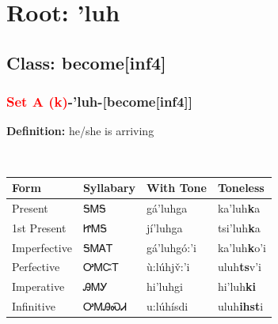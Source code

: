\needspace{4in}
\section*{Root: 'luh}
\nopagebreak
{}
\needspace{3in}
\subsection*{Class: become[inf4]}
\nopagebreak
\needspace{2in}
\subsubsection*{\textcolor{Red}{Set A (k)}{-}\textbf{'luh}{-}[become[inf4]]}
\nopagebreak
\textbf{Definition: } he/she is arriving
\\[0.5em]
\begin{tabularx}{\textwidth}{l X X X}%
\toprule%
\textbf{Form}&\textbf{Syllabary}&\textbf{With Tone}&\textbf{Toneless}\\%
\midrule%
Present&ᎦᎷᎦ&gá’luhga&ka'luh\textbf{k}a\\%
1st Present&ᏥᎷᎦ&jí’luhga&tsi'luh\textbf{k}a\\%
Imperfective&ᎦᎷᎪᎢ&gá’luhgó:’i&ka'luh\textbf{k}o'i\\%
Perfective&ᎤᎷᏨᎢ&ù:lúhjv̌:’i&uluh\textbf{ts}v'i\\%
Imperative&ᎯᎷᎩ&hi’luhgi&hi'luh\textbf{ki}\\%
Infinitive&ᎤᎷᎯᏍᏗ&u:lúhísdi&uluh\textbf{ihst}i\\%
\bottomrule%
\end{tabularx}
\\[1em]